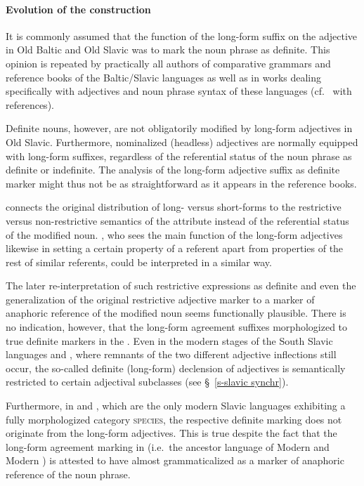 \paragraph{Evolution of the construction} 
It is commonly assumed that the function of the long-form suffix on the adjective in Old Baltic and Old Slavic was to mark the noun phrase as definite. This opinion is repeated by practically all authors of comparative grammars and reference books of the Baltic\slash{}Slavic languages as well as in works dealing specifically with adjectives and noun phrase syntax of these languages (cf.~\citealt[211]{mendoza2004} with references).

Definite nouns, however, are not obligatorily modified by long-form adjectives in Old Slavic. Furthermore, nominalized (headless) adjectives are normally equipped with long-form suffixes, regardless of the referential status of the noun phrase as definite or indefinite. The analysis of the long-form adjective suffix as definite marker might thus not be as straightforward as it appears in the reference books. 

\citet[214–215]{mendoza2004} connects the original distribution of long- versus short-forms to the restrictive versus non-restrictive semantics of the attribute instead of the referential status of the modified noun. \citet{tolstoj1957}, who sees the main function of the long-form adjectives likewise in setting a certain property of a referent apart from properties of the rest of similar referents, could be interpreted in a similar way.

The later re-interpretation of such restrictive expressions as definite and even the generalization of the original restrictive adjective marker to a marker of anaphoric reference of the modified noun seems functionally plausible. There is no indication, however, that the long-form agreement suffixes morphologized to true definite markers in the . Even in the modern stages of the South Slavic languages  and , where remnants of the two different adjective inflections still occur, the so-called definite (long-form) declension of adjectives is semantically restricted to certain adjectival subclasses (see \S~\ref{s-slavic synchr}). 

Furthermore, in  and , which are the only modern Slavic languages exhibiting a fully morphologized category \textsc{species}, the respective definite marking does not originate from the long-form adjectives. This is true despite the fact that the long-form agreement marking in  (i.e.~the ancestor language of Modern  and Modern ) is attested to have almost grammaticalized as a marker of anaphoric reference of the noun phrase.

